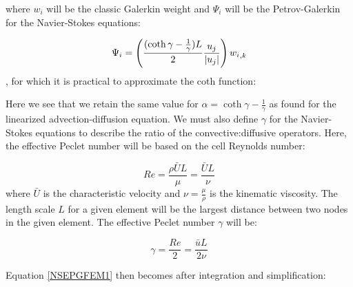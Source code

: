 where $w_i$ will be the classic Galerkin weight and $\Psi_i$ will be the Petrov-Galerkin for the Navier-Stokes equations:

\begin{equation}
 \label{PGTest}
  \Psi_i = \left( \frac{({\coth{\gamma} - \frac{1}{\gamma}}){L}}{2}{\frac{u_j}{\left| u_j \right|}} \right){ {w_{i}}_{,k} }
\end{equation},
 for which it is practical to approximate the coth function:



Here we see that we retain the same value for $\alpha={\coth{\gamma} - \frac{1}{\gamma}}$ as found for the linearized advection-diffusion equation. We must also define $\gamma$ for the Navier-Stokes equations to describe the ratio of the convective:diffusive operators. Here, the effective Peclet number will be based on the cell Reynolds number:

\begin{equation}
 Re = \frac{\rho\bar{U}L}{\mu}  =\frac{\bar{U}L}{\nu}
\end{equation}
where $\bar{U}$ is the characteristic velocity and $\nu=\frac{\mu}{\rho}$ is the kinematic viscosity. The length scale $L$ for a given element will be the largest distance between two nodes in the given element. The effective Peclet number $\gamma$ will be:

\begin{equation}
  \gamma= \frac{Re}{2}  = \frac{\bar{u}L}{2\nu}
\end{equation}

Equation \eqref{NSEPGFEM1} then becomes after integration and simplification:


